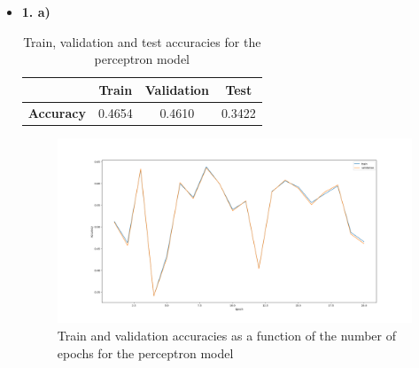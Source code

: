 \documentclass[12pt]{article}
\begin{document}
\begin{itemize}
    \item \textbf{1. a)}
        \begin{table}[H]
            \centering
            \begin{tabular}{|c|c|c|c|}
                \toprule
                & \textbf{Train} & \textbf{Validation} & \textbf{Test} \\
                \midrule
                \textbf{Accuracy} & 0.4654         & 0.4610              & 0.3422        \\
                \bottomrule
            \end{tabular}
            \label{tab:1.1a}
            \caption{Train, validation and test accuracies for the perceptron model}
        \end{table}

        \begin{figure}[H]
            \centering
            \includegraphics[width=1\linewidth]{../outputs/hw1-q1-1a.png}
            \caption{Train and validation accuracies as a function of the number of epochs for the perceptron model}
            \label{fig:1.1a}
        \end{figure}
        \clearpage


\end{itemize}
\end{document}
